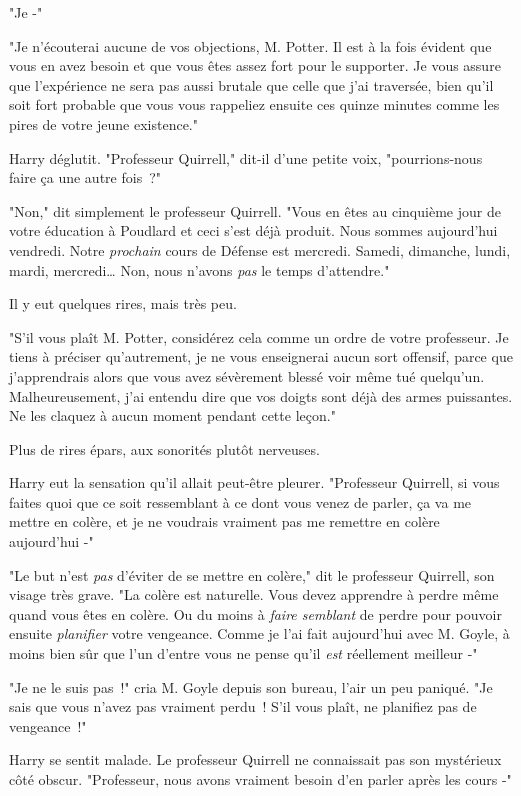"Je -"

"Je n'écouterai aucune de vos objections, M. Potter. Il est à la fois évident que vous en avez besoin et que vous êtes assez fort pour le supporter. Je vous assure que l'expérience ne sera pas aussi brutale que celle que j'ai traversée, bien qu'il soit fort probable que vous vous rappeliez ensuite ces quinze minutes comme les pires de votre jeune existence."

Harry déglutit. "Professeur Quirrell," dit-il d'une petite voix, "pourrions-nous faire ça une autre fois~?"

"Non," dit simplement le professeur Quirrell. "Vous en êtes au cinquième jour de votre éducation à Poudlard et ceci s'est déjà produit. Nous sommes aujourd'hui vendredi. Notre \emph{prochain} cours de Défense est mercredi. Samedi, dimanche, lundi, mardi, mercredi… Non, nous n'avons \emph{pas} le temps d'attendre."

Il y eut quelques rires, mais très peu.

"S'il vous plaît M. Potter, considérez cela comme un ordre de votre professeur. Je tiens à préciser qu'autrement, je ne vous enseignerai aucun sort offensif, parce que j'apprendrais alors que vous avez sévèrement blessé voir même tué quelqu'un. Malheureusement, j'ai entendu dire que vos doigts sont déjà des armes puissantes. Ne les claquez à aucun moment pendant cette leçon."

Plus de rires épars, aux sonorités plutôt nerveuses.

Harry eut la sensation qu'il allait peut-être pleurer. "Professeur Quirrell, si vous faites quoi que ce soit ressemblant à ce dont vous venez de parler, ça va me mettre en colère, et je ne voudrais vraiment pas me remettre en colère aujourd'hui -"

"Le but n'est \emph{pas} d'éviter de se mettre en colère," dit le professeur Quirrell, son visage très grave. "La colère est naturelle. Vous devez apprendre à perdre même quand vous êtes en colère. Ou du moins à \emph{faire semblant} de perdre pour pouvoir ensuite \emph{planifier} votre vengeance. Comme je l'ai fait aujourd'hui avec M. Goyle, à moins bien sûr que l'un d'entre vous ne pense qu'il \emph{est} réellement meilleur -"

"Je ne le suis pas~!" cria M. Goyle depuis son bureau, l'air un peu paniqué. "Je sais que vous n'avez pas vraiment perdu~! S'il vous plaît, ne planifiez pas de vengeance~!"

Harry se sentit malade. Le professeur Quirrell ne connaissait pas son mystérieux côté obscur. "Professeur, nous avons vraiment besoin d'en parler après les cours -"

